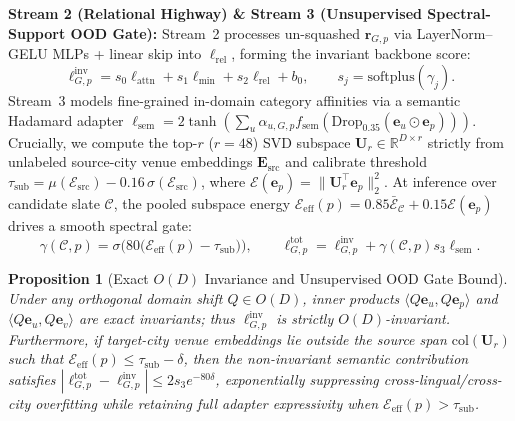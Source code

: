 \documentclass[final,5p,twocolumn]{elsarticle}
\newtheorem{proposition}{Proposition}
\begin{document}
\textbf{Stream 2 (Relational Highway) \& Stream 3 (Unsupervised Spectral-Support OOD Gate):} Stream~2 processes un-squashed $\mathbf{r}_{G,p}$ via LayerNorm--GELU MLPs + linear skip into $\ell_{\text{rel}}$, forming the invariant backbone score:
\begin{equation}
\ell^{\text{inv}}_{G,p} = s_0 \ell_{\text{attn}} + s_1 \ell_{\text{min}} + s_2 \ell_{\text{rel}} + b_0, \qquad s_j = \text{softplus}(\gamma_j).
\label{eq:invlogit}
\end{equation}
Stream~3 models fine-grained in-domain category affinities via a semantic Hadamard adapter $\ell_{\text{sem}} = 2\tanh(\sum_u \alpha_{u,G,p} f_{\text{sem}}(\text{Drop}_{0.35}(\mathbf{e}_u \odot \mathbf{e}_p)))$. Crucially, we compute the top-$r$ ($r{=}48$) SVD subspace $\mathbf{U}_r \in \mathbb{R}^{D \times r}$ strictly from unlabeled source-city venue embeddings $\mathbf{E}_{\text{src}}$ and calibrate threshold $\tau_{\text{sub}} = \mu(\mathcal{E}_{\text{src}}) - 0.16\,\sigma(\mathcal{E}_{\text{src}})$, where $\mathcal{E}(\mathbf{e}_p) = \|\mathbf{U}_r^\top \mathbf{e}_p\|_2^2$. At inference over candidate slate $\mathcal{C}$, the pooled subspace energy $\mathcal{E}_{\text{eff}}(p) = 0.85 \bar{\mathcal{E}}_{\mathcal{C}} + 0.15 \mathcal{E}(\mathbf{e}_p)$ drives a smooth spectral gate:
\begin{equation}
\gamma(\mathcal{C}, p) = \sigma\!\big(80\big(\mathcal{E}_{\text{eff}}(p) - \tau_{\text{sub}}\big)\big), \qquad \ell^{\text{tot}}_{G,p} = \ell^{\text{inv}}_{G,p} + \gamma(\mathcal{C}, p) s_3 \ell_{\text{sem}}.
\label{eq:specgate}
\end{equation}

\begin{proposition}[Exact $O(D)$ Invariance and Unsupervised OOD Gate Bound]
Under any orthogonal domain shift $Q \in O(D)$, inner products $\langle Q\mathbf{e}_u, Q\mathbf{e}_p\rangle$ and $\langle Q\mathbf{e}_u, Q\mathbf{e}_v\rangle$ are exact invariants; thus $\ell^{\text{inv}}_{G,p}$ is strictly $O(D)$-invariant. Furthermore, if target-city venue embeddings lie outside the source span $\text{col}(\mathbf{U}_r)$ such that $\mathcal{E}_{\text{eff}}(p) \le \tau_{\text{sub}} - \delta$, then the non-invariant semantic contribution satisfies $|\ell^{\text{tot}}_{G,p} - \ell^{\text{inv}}_{G,p}| \le 2 s_3 e^{-80\delta}$, exponentially suppressing cross-lingual/cross-city overfitting while retaining full adapter expressivity when $\mathcal{E}_{\text{eff}}(p) > \tau_{\text{sub}}$.
\end{proposition}
\end{document}
